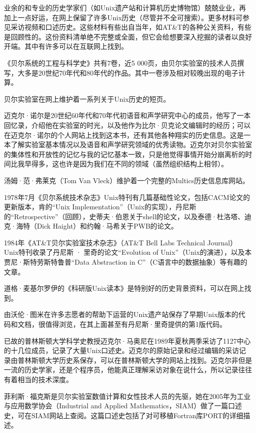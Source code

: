 \documentclass[a4paper,12pt,UTF8,twoside]{ctexbook}
\begin{document}
业余的和专业的历史学家们（如Unix遗产站和计算机历史博物馆）兢兢业业，再加上一点好运，在网上保留了许多Unix历史（尽管并不全可搜索）。更多材料可参见采访视频和口述历史。这些材料有些出自当年，如AT\&T的各种公关资料，有些是回顾性的。这份资料清单绝不完整或全面，但它会给想要深入挖掘的读者以良好开端。其中有许多可以在互联网上找到。

《贝尔系统的工程与科学史》共有7卷，近5 000页，由贝尔实验室的技术人员撰写，大多是20世纪70年代和80年代的作品。其中一卷涉及相对较晚出现的电子计算。

贝尔实验室在网上维护着一系列关于Unix历史的短页。

迈克尔·诺尔是20世纪60年代和70年代初语音和声学研究中心的成员，他写了一本回忆录，介绍他在实验室的时光，以及他作为比尔·贝克论文编辑时的经历；可以在迈克尔·诺尔的个人网站上找到这本书，还有其他各种翔实的历史信息。这是一本了解实验室基本情况以及语音和声学研究领域的优秀读物。迈克尔对贝尔实验室的集体性和开放性的记忆与我的记忆基本一致，只是他觉得事情开始分崩离析的时间比我早得多，这也许是因为我们在不同的领域（虽然组织结构上相邻）。

汤姆·范·弗莱克（Tom Van Vleck）维护着一个完整的Multics历史信息库网站。

1978年7月《贝尔系统技术杂志》Unix特刊有几篇基础性论文，包括CACM论文的更新版本，肯的“Unix Implementation”（Unix的实现），丹尼斯的“Retrospective”（回顾），史蒂夫·伯恩关于shell的论文，以及泰德·杜洛塔、迪克·海特（Dick Haight）和约翰·马希关于PWB的论文。

1984年《AT\&T贝尔实验室技术杂志》（AT\&T Bell Labs Technical Journal） Unix特刊收录了丹尼斯 · 里奇的论文“Evolution of Unix”（Unix的演进），以及本贾尼·斯特劳斯特鲁普“Data Abstraction in C”（C语言中的数据抽象）等有趣的文章。

道格·麦基尔罗伊的《科研版Unix读本》是特别好的历史背景资料，可以在网上找到。

由沃伦·图米在许多志愿者的帮助下运营的Unix遗产站保存了早期Unix版本的代码和文档，很值得浏览，在其上面甚至有丹尼斯·里奇提供的第1版代码。

已故的普林斯顿大学科学史教授迈克尔·马奥尼在1989年夏秋两季采访了1127中心的十几位成员，记录了大量Unix口述史。迈克尔的原始记录和经过编辑的采访记录由普林斯顿大学历史系保存，可以在普林斯顿大学的网站上找到。迈克尔非但是一流的历史学家，还是个程序员，他能真正理解采访对象在说什么，所以记录往往有着相当的技术深度。

菲利斯·福克斯是贝尔实验室数值计算和女性技术人员的先驱，她在2005年为工业与应用数学协会（Industrial and Applied Mathematics，SIAM）做了一篇口述史，可在SIAM网站上查阅。这篇口述史包括了对可移植Fortran库PORT的详细描述。
\end{document}

